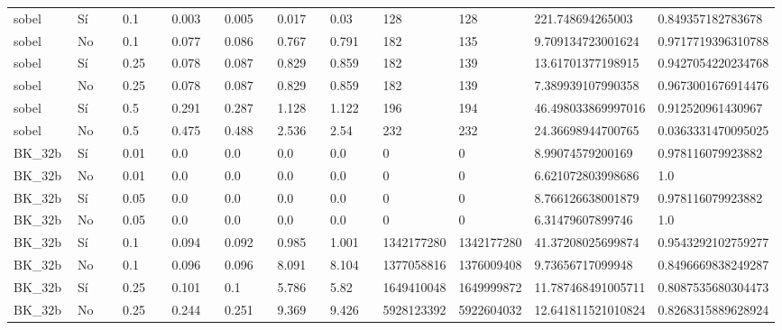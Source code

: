 {{\begin{longtable}{M{0.09\linewidth}M{0.09\linewidth}M{0.09\linewidth}M{0.09\linewidth}M{0.09\linewidth}M{0.09\linewidth}M{0.09\linewidth}M{0.09\linewidth}M{0.09\linewidth}M{0.09\linewidth}M{0.09\linewidth}}
sobel & Sí & \num{0.1} & \num{0.003} & \num{0.005} & \num{0.017} & \num{0.03} & \num{128} & \num{128} & \num{221.748694265003} & \num{0.849357182783678} \\
sobel & No & \num{0.1} & \num{0.077} & \num{0.086} & \num{0.767} & \num{0.791} & \num{182} & \num{135} & \num{9.709134723001624} & \num{0.9717719396310788} \\
sobel & Sí & \num{0.25} & \num{0.078} & \num{0.087} & \num{0.829} & \num{0.859} & \num{182} & \num{139} & \num{13.61701377198915} & \num{0.9427054220234768} \\
sobel & No & \num{0.25} & \num{0.078} & \num{0.087} & \num{0.829} & \num{0.859} & \num{182} & \num{139} & \num{7.389939107990358} & \num{0.9673001676914476} \\
sobel & Sí & \num{0.5} & \num{0.291} & \num{0.287} & \num{1.128} & \num{1.122} & \num{196} & \num{194} & \num{46.498033869997016} & \num{0.912520961430967} \\
sobel & No & \num{0.5} & \num{0.475} & \num{0.488} & \num{2.536} & \num{2.54} & \num{232} & \num{232} & \num{24.36698944700765} & \num{0.0363331470095025} \\
BK\_32b & Sí & \num{0.01} & \num{0.0} & \num{0.0} & \num{0.0} & \num{0.0} & \num{0} & \num{0} & \num{8.99074579200169} & \num{0.978116079923882} \\
BK\_32b & No & \num{0.01} & \num{0.0} & \num{0.0} & \num{0.0} & \num{0.0} & \num{0} & \num{0} & \num{6.621072803998686} & \num{1.0} \\
BK\_32b & Sí & \num{0.05} & \num{0.0} & \num{0.0} & \num{0.0} & \num{0.0} & \num{0} & \num{0} & \num{8.766126638001879} & \num{0.978116079923882} \\
BK\_32b & No & \num{0.05} & \num{0.0} & \num{0.0} & \num{0.0} & \num{0.0} & \num{0} & \num{0} & \num{6.31479607899746} & \num{1.0} \\
BK\_32b & Sí & \num{0.1} & \num{0.094} & \num{0.092} & \num{0.985} & \num{1.001} & \num{1342177280} & \num{1342177280} & \num{41.37208025699874} & \num{0.9543292102759277} \\
BK\_32b & No & \num{0.1} & \num{0.096} & \num{0.096} & \num{8.091} & \num{8.104} & \num{1377058816} & \num{1376009408} & \num{9.73656717099948} & \num{0.8496669838249287} \\
BK\_32b & Sí & \num{0.25} & \num{0.101} & \num{0.1} & \num{5.786} & \num{5.82} & \num{1649410048} & \num{1649999872} & \num{11.787468491005711} & \num{0.8087535680304473} \\
BK\_32b & No & \num{0.25} & \num{0.244} & \num{0.251} & \num{9.369} & \num{9.426} & \num{5928123392} & \num{5922604032} & \num{12.641811521010824} & \num{0.8268315889628924} \\

\end{longtable}}}
